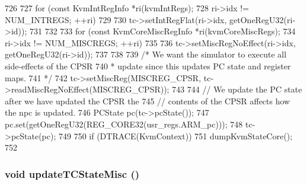 \begin{DoxyCode}
726 {
727     for (const KvmIntRegInfo *ri(kvmIntRegs);
728          ri->idx != NUM_INTREGS; ++ri) {
729 
730         tc->setIntRegFlat(ri->idx, getOneRegU32(ri->id));
731     }
732 
733     for (const KvmCoreMiscRegInfo *ri(kvmCoreMiscRegs);
734          ri->idx != NUM_MISCREGS; ++ri) {
735 
736         tc->setMiscRegNoEffect(ri->idx, getOneRegU32(ri->id));
737     }
738 
739     /* We want the simulator to execute all side-effects of the CPSR
740      * update since this updates PC state and register maps.
741      */
742     tc->setMiscReg(MISCREG_CPSR, tc->readMiscRegNoEffect(MISCREG_CPSR));
743 
744     // We update the PC state after we have updated the CPSR the
745     // contents of the CPSR affects how the npc is updated.
746     PCState pc(tc->pcState());
747     pc.set(getOneRegU32(REG_CORE32(usr_regs.ARM_pc)));
748     tc->pcState(pc);
749 
750     if (DTRACE(KvmContext))
751         dumpKvmStateCore();
752 }
\end{DoxyCode}
\hypertarget{classArmKvmCPU_aa29d443c292712c817d1464fba8943d7}{
\subsubsection[{updateTCStateMisc}]{\setlength{\rightskip}{0pt plus 5cm}void updateTCStateMisc ()}}
\label{classArmKvmCPU_aa29d443c292712c817d1464fba8943d7}



